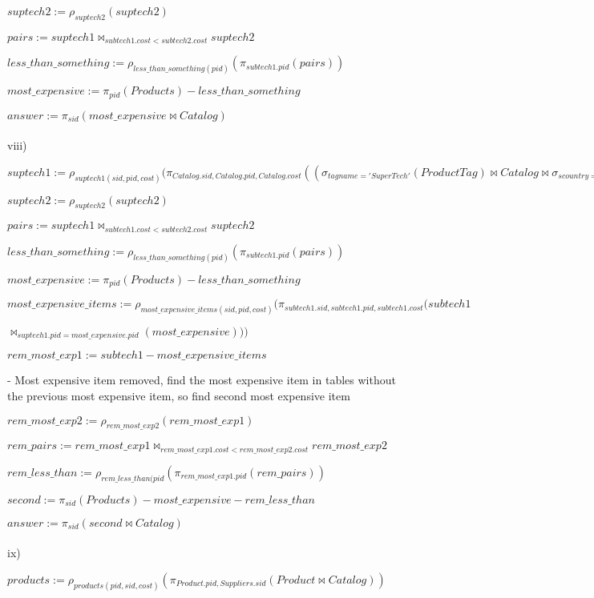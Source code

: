 \documentclass[10pt]{article}
\begin{document}
$suptech2 := \rho_{suptech2}(suptech2)$

$pairs := suptech1 \bowtie_{subtech1.cost < subtech2.cost} suptech2$

$less\_than\_something := \rho_{less\_than\_something(pid)}(\pi_{subtech1.pid}(pairs))$

$most\_expensive := \pi_{pid}(Products) - less\_than\_something$

$answer := \pi_{sid}(most\_expensive \bowtie Catalog)$
\\~\\
viii)

$suptech1 := \rho_{suptech1(sid, pid, cost)}(\pi_{Catalog.sid, Catalog.pid, Catalog.cost}((\sigma_{tagname = 'Super Tech'}(ProductTag) \bowtie Catalog \bowtie \sigma_{scountry = 'USA'}(Suppliers)))$

$suptech2 := \rho_{suptech2}(suptech2)$

$pairs := suptech1 \bowtie_{subtech1.cost < subtech2.cost} suptech2$

$less\_than\_something := \rho_{less\_than\_something(pid)}(\pi_{subtech1.pid}(pairs))$

$most\_expensive := \pi_{pid}(Products) - less\_than\_something$

$most\_expensive\_items := \rho_{most\_expensive\_items(sid, pid, cost)}(\pi_{subtech1.sid, subtech1.pid, subtech1.cost}(subtech1 $

$\bowtie_{suptech1.pid = most\_expensive.pid}(most\_expensive)))$

$rem\_most\_exp1 := subtech1 - most\_expensive\_items$

- Most expensive item removed, find the most expensive item in tables without the previous most expensive item, so find second most expensive item

$rem\_most\_exp2 := \rho_{rem\_most\_exp2}(rem\_most\_exp1)$

$rem\_pairs := rem\_most\_exp1 \bowtie_{rem\_most\_exp1.cost < rem\_most\_exp2.cost} rem\_most\_exp2$

$rem\_less\_than := \rho_{rem\_less\_than(pid}(\pi_{rem\_most\_exp1.pid}(rem\_pairs))$

$second := \pi_{sid}(Products) - most\_expensive - rem\_less\_than$

$answer := \pi_{sid}(second \bowtie Catalog)$
\\~\\
ix)

$products := \rho_{products(pid, sid, cost)}(\pi_{Product.pid, Suppliers.sid}(Product \bowtie Catalog))$
\end{document}
